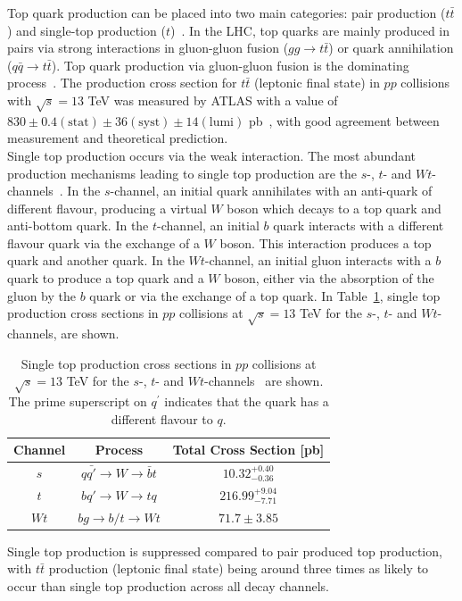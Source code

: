 Top quark production can be placed into two main categories: pair production ($t\bar{t}$) and single-top production ($t$)~\cite{dasilva2016quark}. In the LHC, top quarks are mainly produced in pairs via strong interactions in gluon-gluon fusion ($gg\rightarrow t\bar{t}$) or quark annihilation ($q\bar{q}\rightarrow t\bar{t}$). Top quark production via gluon-gluon fusion is the dominating process~\cite{Ball_2015}. The production cross section for $t\bar{t}$ (leptonic final state) in $pp$ collisions with $\sqrt{s} = 13$ TeV was measured by ATLAS with a value of $830 \pm 0.4 (\text{stat}) \pm 36 (\text{syst}) \pm 14 (\text{lumi})$ pb~\cite{ATLAS-tt-crossSection-2020}, with good agreement between measurement and theoretical prediction.\\

\noindent
Single top production occurs via the weak interaction. The most abundant production mechanisms leading to single top production are the $s$-, $t$- and $Wt$- channels~\cite{pdg}. In the $s$-channel, an initial quark annihilates with an anti-quark of different flavour, producing a virtual $W$ boson which decays to a top quark and anti-bottom quark. In the $t$-channel, an initial $b$ quark interacts with a different flavour quark via the exchange of a $W$ boson. This interaction produces a top quark and another quark. In the $Wt$-channel, an initial gluon interacts with a $b$ quark to produce a top quark and a $W$ boson, either via the absorption of the gluon by the $b$ quark or via the exchange of a top quark. In Table~\ref{tab:single-top-crossSection}, single top production cross sections in $pp$ collisions at $\sqrt{s}=13$ TeV for the $s$-, $t$- and $Wt$-channels, are shown.


\begin{table}[h!]
\def\arraystretch{1.5}%
\begin{tabular}{c|c|c}
\hline
Channel & Process & Total Cross Section [pb] \\ \hline
$s$& $q\bar{q'}\rightarrow   W \rightarrow \bar{b}t$& $10.32^{+0.40}_{-0.36}$  \\
$t$ & $bq'\rightarrow W \rightarrow tq$ &  $216.99^{+9.04}_{-7.71}$\\
$Wt$& $bg \rightarrow  b/t \rightarrow Wt$ &  $71.7\pm 3.85$\\ \hline
\end{tabular}
\centering
\caption{Single top production cross sections in $pp$ collisions at $\sqrt{s}=13$ TeV for the $s$-, $t$- and $Wt$-channels~\cite{summaryPlots} are shown. The prime superscript on $q^{'}$ indicates that the quark has a different flavour to $q$. }
\label{tab:single-top-crossSection}
\end{table}
\noindent
Single top production is suppressed compared to pair produced top production, with $t\bar{t}$ production (leptonic final state) being around three times as likely to occur than single top production across all decay channels.


